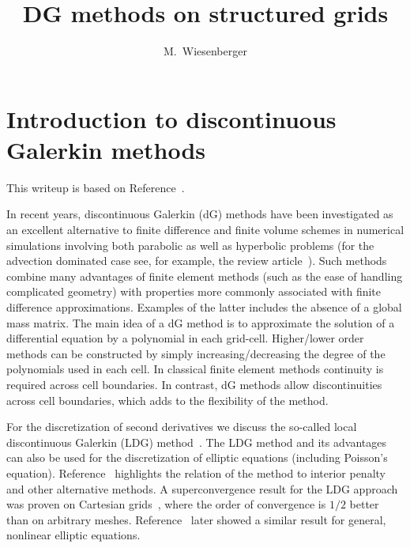 




\title{DG methods on structured grids}
\author{M.~Wiesenberger}

\section{ Introduction to discontinuous Galerkin methods} \label{sec:discretization}
This writeup is based on Reference~\cite{WiesenbergerPhD}. 

In recent years, discontinuous Galerkin (dG) methods have been investigated 
as an excellent alternative to finite difference and finite volume schemes 
in numerical simulations involving both parabolic as well as hyperbolic problems 
(for the advection dominated case see, for example, the review article~\cite{Cockburn2001runge}). 
Such methods combine many advantages of finite element methods (such as the ease of handling 
complicated geometry) with properties more commonly associated with 
finite difference approximations. Examples of the latter includes the absence 
of a global mass matrix. 
The main idea of a dG method is to approximate the solution 
of a differential equation by a polynomial in each grid-cell. 
Higher/lower
order methods can be constructed by simply increasing/decreasing the degree of 
the polynomials used in each cell. 
In classical finite element methods continuity is required across cell boundaries. 
In contrast, dG methods allow discontinuities across cell boundaries, which adds to the flexibility of the method.

For the discretization of second derivatives we discuss the so-called local discontinuous Galerkin (LDG) method~\cite{Cockburn1998}.
The LDG method and its advantages can also be used for the discretization of 
elliptic equations (including Poisson's equation). 
Reference~\cite{Arnold2001} highlights the relation 
of the method to interior penalty and other alternative methods. 
A superconvergence result for the 
LDG approach was proven on Cartesian grids~\cite{Cockburn2001},
where the order of convergence is $1/2$ better than on arbitrary meshes.
Reference~\cite{Yadav2013} later showed a similar result for general, nonlinear elliptic equations.

